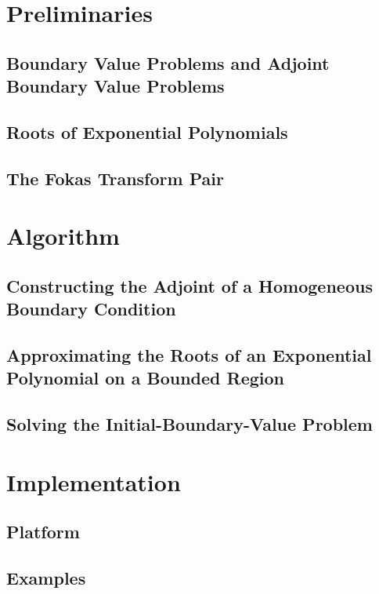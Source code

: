 \documentclass[11pt, oneside, a4paper]{article}
\begin{document}
\section{Preliminaries}
\subsection{Boundary Value Problems and Adjoint Boundary Value Problems}
\subsection{Roots of Exponential Polynomials}
\subsection{The Fokas Transform Pair}

\section{Algorithm}
\subsection{Constructing the Adjoint of a Homogeneous Boundary Condition}
\subsection{Approximating the Roots of an Exponential Polynomial on a Bounded Region}
\subsection{Solving the Initial-Boundary-Value Problem}

\section{Implementation}
\subsection{Platform}
\subsection{Examples}

\pagebreak
{}

% 
% 
\end{document}
